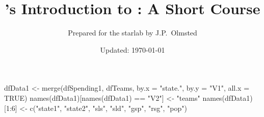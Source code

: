 \documentclass[10pt,letterpaper]{article}
\author{Prepared for the starlab by J.P.\ Olmsted}
\title{\tsl{}'s Introduction to \R: A Short Course}
\date{Updated: \today}
\begin{document}
dfData1 <- merge(dfSpending1, dfTeams, by.x = "state.", by.y = "V1", all.x = TRUE)
names(dfData1)[names(dfData1) == "V2"] <- "teams"
names(dfData1)[1:6] <- c("state1", "state2", "sls", "sld", "gsp", "rsg", "pop")
\end{document}
